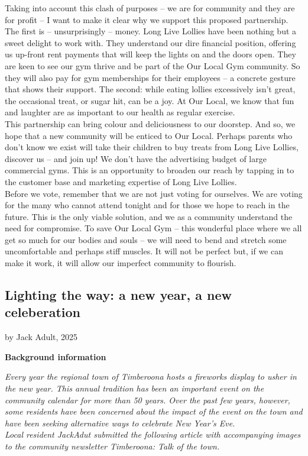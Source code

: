 \documentclass[a4paper]{article}
\begin{document}
Taking into account this clash of purposes – we are for community and they are for profit – I want to make it clear why we support this proposed partnership. The first is – unsurprisingly – money. Long Live Lollies have been nothing but a sweet delight to work with. They understand our dire financial position, offering us up-front rent payments that will keep the lights on and the doors open. They are keen to see our gym thrive and be part of the Our Local Gym community. So they will also pay for gym memberships for their employees – a concrete gesture that shows their support. The second: while eating lollies excessively isn’t great, the occasional treat, or sugar hit, can be a joy. At Our Local, we know that fun and laughter are as important to our health as regular exercise.\\

This partnership can bring colour and deliciousness to our doorstep. And so, we hope that a new community will be enticed to Our Local. Perhaps parents who don’t know we exist will take their children to buy treats from Long Live Lollies, discover us – and join up! We don’t have the advertising budget of large commercial gyms. This is an opportunity to broaden our reach by tapping in to the customer base and marketing expertise of Long Live Lollies.\\

Before we vote, remember that we are not just voting for ourselves. We are voting for the many who cannot attend tonight and for those we hope to reach in the future. This is the only viable solution, and we as a community understand the need for compromise. To save Our Local Gym – this wonderful place where we all get so much for our bodies and souls – we will need to bend and stretch some uncomfortable and perhaps stiff muscles. It will not be perfect but, if we can make it work, it will allow our imperfect community to flourish.\\
\newpage

\subsection{Lighting the way: a new year, a new celeberation}
by Jack Adult, 2025

\textbf{Background information}

\textit{Every year the regional town of Timberoona hosts a fireworks display to usher in the new year. This annual tradition has been an important event on the community calendar for more than 50 years. Over the past few years, however, some residents have been concerned about the impact of the event on the town and have been seeking alternative ways to celebrate New Year's Eve.\\
Local resident JackAdut submitted the following article with accompanying images to the community newsletter Timberoona: Talk of the town.}\\
\end{document}
